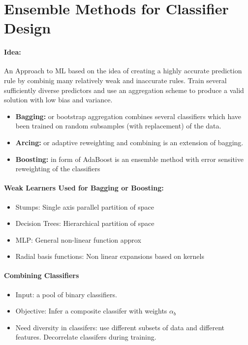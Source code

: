 \section{Ensemble Methods for Classifier Design}

\paragraph{Idea: }
An Approach to ML based on the idea of creating a highly accurate prediction rule by combinig many relatively weak and inaccurate rules. Train several sufficiently diverse predictors and use an aggregation scheme to produce a valid solution with low bias and variance.

\begin{itemize}
    \item \textbf{Bagging: }or bootstrap aggregation combines several classifiers which have been trained on random subsamples (with replacement) of the data. 
    \item \textbf{Arcing: } or adaptive reweighting and combining is an extension of bagging.
    \item \textbf{Boosting: } in form of AdaBoost is an ensemble method with error sensitive reweighting of the classifiers
\end{itemize}{}

\paragraph{Weak Learners Used for Bagging or Boosting: }
\begin{itemize}
    \item Stumps: Single axis parallel partition of space
    \item Decision Trees: Hierarchical partition of space
    \item MLP: General non-linear function approx
    \item Radial basis functions: Non linear expansions based on kernels
\end{itemize}{}

\paragraph{Combining Classifiers}
\begin{itemize}
    \item Input: a pool of binary classifiers.
    \item Objective: Infer a composite classifer with weights $\alpha_b$
    \item Need diversity in classifers: use different subsets of data and different features. Decorrelate classifers during training.
\end{itemize}{}

